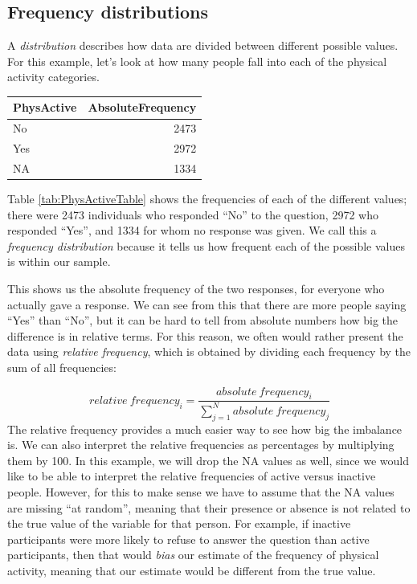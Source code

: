 \documentclass[12pt,]{book}
\theoremstyle{definition}
\theoremstyle{definition}
\theoremstyle{definition}
\theoremstyle{remark}
\begin{document}
\hypertarget{frequency-distributions}{%
\subsection{Frequency distributions}\label{frequency-distributions}}

A \emph{distribution} describes how data are divided between different possible values. For this example, let's look at how many people fall into each of the physical activity categories.

\begin{tabular}{l|r}
\hline
PhysActive & AbsoluteFrequency\\
\hline
No & 2473\\
\hline
Yes & 2972\\
\hline
NA & 1334\\
\hline
\end{tabular}

Table \ref{tab:PhysActiveTable} shows the frequencies of each of the different values; there were 2473 individuals who responded ``No'' to the question, 2972 who responded ``Yes'', and 1334 for whom no response was given. We call this a \emph{frequency distribution} because it tells us how frequent each of the possible values is within our sample.

This shows us the absolute frequency of the two responses, for everyone who actually gave a response. We can see from this that there are more people saying ``Yes'' than ``No'', but it can be hard to tell from absolute numbers how big the difference is in relative terms. For this reason, we often would rather present the data using \emph{relative frequency}, which is obtained by dividing each frequency by the sum of all frequencies:

\[
relative\ frequency_i = \frac{absolute\ frequency_i}{\sum_{j=1}^N absolute\ frequency_j}
\]
The relative frequency provides a much easier way to see how big the imbalance is. We can also interpret the relative frequencies as percentages by multiplying them by 100. In this example, we will drop the NA values as well, since we would like to be able to interpret the relative frequencies of active versus inactive people. However, for this to make sense we have to assume that the NA values are missing ``at random'', meaning that their presence or absence is not related to the true value of the variable for that person. For example, if inactive participants were more likely to refuse to answer the question than active participants, then that would \emph{bias} our estimate of the frequency of physical activity, meaning that our estimate would be different from the true value.
\end{document}

